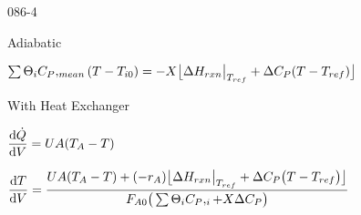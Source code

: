 \begin{mitframe}{086-4}

    
\begin{listone}

	\item Adiabatic
    
    \item $\sum\nolimits\dimltemp_{\state}\cp,_{mean}(\Temp-\Temp_{\state\init})=-X\big\lfloor\iipf\enthalpy_{rxn}\big|_{\Temp_{ref}}+\iipf\cp(\Temp-\Temp_{ref})\big\rfloor$
    
    \item With Heat Exchanger
    
    \item $\dfrac{\mathrm{d}\dot{\heatflow}}{\mathrm{d}\vol}=\uvel\helmholtz(\Temp_{\helmholtz}-\Temp)$
    
    \item $\dfrac{\mathrm{d}\Temp}{\mathrm{d}\vol}=\dfrac{\uvel\helmholtz(\Temp_{\helmholtz}-\Temp)+(-\pos_{\helmholtz})\big\lfloor\iipf\enthalpy_{rxn}\big|_{\Temp_{ref}}+\iipf\cp\big(\Temp-\Temp_{ref}\big)\big\rfloor}{\force_{\helmholtz\init}\big(\sum\dimltemp_{\state}\cp,
    _{\state}+X\iipf\cp\big)}$
\end{listone}   
    
\end{mitframe}